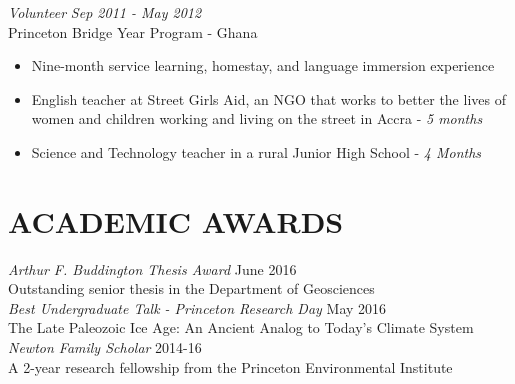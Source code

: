 \documentclass[overlapped, 11pt]{res} %
\begin{document}
\begin{resume}
{\sl Volunteer} \hfill \emph{Sep 2011 - May 2012}\\
Princeton Bridge Year Program - Ghana
\begin{itemize} \itemsep -2pt
\item Nine-month service learning, homestay, and language immersion experience
\item English teacher at Street Girls Aid, an NGO that works to better the lives of women and children working and living on the street in Accra  - \emph{5 months}
\item Science and Technology teacher in a rural Junior High School - \emph{4 Months}
\end{itemize} 





\section{ACADEMIC AWARDS}
\emph{Arthur F. Buddington Thesis Award}  \hfill June 2016\\  \hphantom{Title}  Outstanding senior thesis in the Department of Geosciences  \ \\
{\sl Best Undergraduate Talk - Princeton Research Day} \hfill May 2016 \\
\hphantom{Title} {The Late Paleozoic Ice Age: An Ancient Analog to Today's Climate System} \\
{\sl Newton Family Scholar} \hfill 2014-16 \\
\hphantom{Title} A 2-year research fellowship from the Princeton Environmental Institute


\end{resume}
\end{document}
